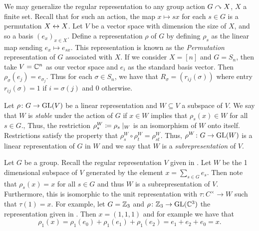 \documentclass[letterpaper, 11pt, oneside]{book}
\begin{document}
\clearpage

\begin{ex}\label{ex:perm_rep}
  We may generalize the regular representation to any group action $G \curvearrowright X$, $X$ a finite set.
  Recall that for such an action, the map $x \mapsto sx$ for each $s \in G$ is a permutation $X \leftrightarrow X$.
  Let $V$ be a vector space with dimension the size of $X$, and so a basis $(e_{x})_{x \in X}$.
  Define a representation $\rho$ of $G$ by defining $\rho_{s}$ as the linear map sending $e_{x} \mapsto e_{sx}$.
  This representation is known as the \emph{Permutation} representation of $G$ associated with $X$.
  If we consider $X = [n]$ and $G = S_{n}$, then take $V = \mathbb{C}^{n}$ as our vector space and $e_{i}$ as the standard basis vector.
  Then $\rho_{\sigma}(e_{j}) = e_{\sigma_{j}}$.
  Thus for each $\sigma \in S_{n}$, we have that $R_{\sigma} = (r_{ij}(\sigma))$ where entry $r_{ij}(\sigma) = 1$ if $i = \sigma(j)$ and $0$ otherwise.
\end{ex}

\begin{defn}
  Let $\rho\colon G \to \operatorname{GL}(V)$ be a linear representation and $W \subseteq V$ a subspace of $V$.
  We say that $W$ is \emph{stable} under the action of $G$ if $x \in W$ implies that $\rho_{s}(x) \in W$ for all $s \in G$.,
  Thus, the restriction $\rho_{s}^{W} \coloneqq \rho_{s}\mid_{W}$ is an isomorphism of $W$ onto itself.
  Restrictions satisfy the property that $\rho_{s}^{W} \circ \rho_{t}^{W} = \rho_{st}^{W}$.
  Thus, $\rho^{W}\colon G \to \operatorname{GL}(W)$ is a linear representation of $G$ in $W$ and we say that $W$ is a \emph{subrepresentation} of $V$.
\end{defn}

\begin{ex}\label{ex:subrep_reg_rep}
  Let $G$ be a group.
  Recall the regular representation $V$ given in .
  Let $W$ be the 1 dimensional subspace of $V$ generated by the element $x = \sum_{s \in G} e_{s}$.
  Then note that $\rho_{s}(x) = x$ for all $s \in G$ and thus $W$ is a subrepresentation of $V$.
  Furthermore, this is isomorphic to the unit representation  with $\tau\colon C^{\times} \to W$ such that $\tau(1) = x$.
  For example, let $G = \mathbb{Z}_{3}$ and $\rho\colon \mathbb{Z}_{3} \to \operatorname{GL}(\mathbb{C}^{3})$ the representation given in .
  Then $x = (1, 1, 1)$ and for example we have that
  \[
    \rho_{1}(x) = \rho_{1}(e_{0}) + \rho_{1}(e_{1}) + \rho_{1}(e_{2}) = e_{1} + e_{2} + e_{0} = x.
  \]
\end{ex}
\end{document}

